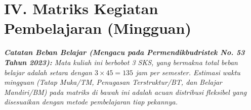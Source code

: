 \documentclass[11pt,a4paper]{article}
\begin{document}
\vspace{0.5cm}
\section*{IV. Matriks Kegiatan Pembelajaran (Mingguan)}

\noindent\textit{\textbf{Catatan Beban Belajar (Mengacu pada Permendikbudristek No. 53 Tahun 2023):} Mata kuliah ini berbobot 3 SKS, yang bermakna total beban belajar adalah setara dengan $3 \times 45 = 135$ jam per semester. Estimasi waktu mingguan (Tatap Muka/TM, Penugasan Terstruktur/BT, dan Belajar Mandiri/BM) pada matriks di bawah ini adalah acuan distribusi fleksibel yang disesuaikan dengan metode pembelajaran tiap pekannya.}
\vspace{0.3cm}
\end{document}
